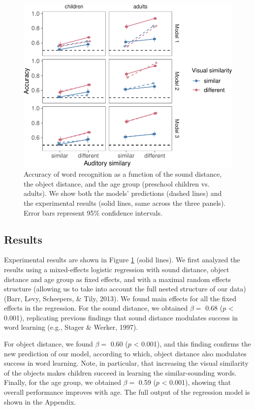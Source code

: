 \documentclass[english,,man,floatsintext]{apa6}
\theoremstyle{definition}
\theoremstyle{definition}
\theoremstyle{definition}
\theoremstyle{remark}
\begin{document}
\begin{figure}[h]

{\centering \includegraphics{ms_files/figure-latex/allData-1} 

}

\caption{Accuracy of word recognition as a function of the sound distance, the object distance, and the age group (preschool children vs. adults). We show both the models' predictions (dashed lines) and the experimental results (solid lines, same across the three panels). Error bars represent 95\% confidence intervals.}\label{fig:allData}
\end{figure}

\subsection{Results}\label{results}

Experimental results are shown in Figure \ref{fig:allData} (solid
lines). We first analyzed the results using a mixed-effects logistic
regression with sound distance, object distance and age group as fixed
effects, and with a maximal random effects structure (allowing us to
take into account the full nested structure of our data) (Barr, Levy,
Scheepers, \& Tily, 2013). We found main effects for all the fixed
effects in the regression. For the sound distance, we obtained
\(\beta =\) 0.68 (\(p\) \textless{} 0.001), replicating previous
findings that sound distance modulates success in word learning (e.g.,
Stager \& Werker, 1997).

For object distance, we found \(\beta =\) 0.60 (\(p\) \textless{}
0.001), and this finding confirms the new prediction of our model,
according to which, object distance also modulates success in word
learning. Note, in particular, that increasing the visual similarity of
the objects makes children succeed in learning the similar-sounding
words. Finally, for the age group, we obtained \(\beta =\) 0.59 (\(p\)
\textless{} 0.001), showing that overall performance improves with age.
The full output of the regression model is shown in the Appendix.
\end{document}
